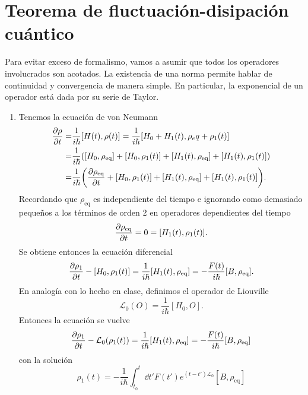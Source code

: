 \documentclass{article}
\begin{document}
\section{Teorema de fluctuación-disipación cuántico}

Para evitar exceso de formalismo, vamos a asumir que todos los operadores involucrados son acotados. La existencia de una norma permite hablar de continuidad y convergencia de manera simple. En particular, la exponencial de un operador está dada por su serie de Taylor.

\begin{enumerate}

\item Tenemos la ecuación de von Neumann
\begin{align}
\begin{split}
\pdv{\rho}{t} (t)=&\frac{1}{i\hbar}[H(t),\rho(t)]=\frac{1}{i\hbar}[H_0+H_1(t),\rho_eq+\rho_1(t)]\\
=&\frac{1}{i\hbar}\qty([H_0,\rho_{\text{eq}}]+[H_0,\rho_1(t)]+[H_1(t),\rho_{\text{eq}}]+[H_1(t),\rho_1(t)])\\
=&\frac{1}{i\hbar}\qty(\pdv{\rho_{\text{eq}}}{t} (t)+[H_0,\rho_1(t)]+[H_1(t),\rho_{\text{eq}}]+[H_1(t),\rho_1(t)]).
\end{split}
\end{align}
Recordando que $\rho_{\text{eq}}$ es independiente del tiempo e ignorando como demasiado pequeños a los términos de orden 2 en operadores dependientes del tiempo
\begin{equation}
\pdv{\rho_{\text{eq}}}{t} (t)=0=[H_1(t),\rho_1(t)].
\end{equation} 
Se obtiene entonces la ecuación diferencial
\begin{equation}
\pdv{\rho_1}{t} (t)-[H_0,\rho_1(t)]=\frac{1}{i\hbar}[H_1(t),\rho_{\text{eq}}]=-\frac{F(t)}{i\hbar}[B,\rho_{\text{eq}}].
\end{equation}
En analogía con lo hecho en clase, definimos el operador de Liouville
\begin{equation}
\mathcal{L}_0(O)=\frac{1}{i\hbar}[H_0,O].
\end{equation}
Entonces la ecuación se vuelve
\begin{equation}
\pdv{\rho_1}{t} (t)-\mathcal{L}_0(\rho_1(t))=\frac{1}{i\hbar}[H_1(t),\rho_{\text{eq}}]=-\frac{F(t)}{i\hbar}[B,\rho_{\text{eq}}]
\end{equation}
con la solución
\begin{equation}
\rho_1(t)=-\frac{1}{i\hbar}\int_{t_0}^t\dd{t'}F(t')e^{(t-t')\mathcal{L}_0}[B,\rho_{\text{eq}}]

\end{equation}
\end{enumerate}
\end{document}
